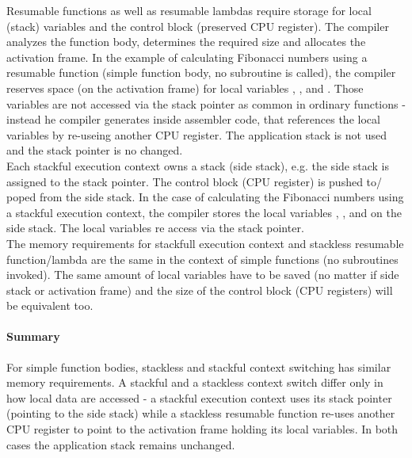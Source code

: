 Resumable functions as well as resumable lambdas require storage for local
(stack) variables and the control block (preserved CPU register). The compiler
analyzes the function body, determines the required size and allocates the
activation frame.
In the example of calculating Fibonacci numbers using a resumable function
(simple function body, no subroutine is called), the compiler reserves space
(on the activation frame) for local variables , ,  and
. Those variables are not accessed via the stack pointer as common in
ordinary functions - instead he compiler generates inside  assembler
code, that references the local variables by re-useing another CPU register. The
application stack is not used and the stack pointer is no changed.\\
\newline
Each stackful execution context owns a stack (side stack), e.g. the side stack
is assigned to the stack pointer. The control block (CPU register) is pushed to/
poped from the side stack.
In the case of calculating the Fibonacci numbers using a stackful execution
context, the compiler stores the local variables , ,  and
 on the side stack. The local variables re access via the stack
pointer.\\
The memory requirements for stackfull execution context and stackless resumable
function/lambda are the same in the context of simple functions (no subroutines
invoked). The same amount of local variables have to be saved (no matter if side
stack or activation frame) and the size of the control block (CPU registers)
will be equivalent too.\\
\newline
\paragraph*{Summary}
For simple function bodies, stackless and stackful context switching has similar
memory requirements. A stackful and a stackless context switch differ only in
how local data are accessed - a stackful execution context uses its stack
pointer (pointing to the side stack) while a stackless resumable function
re-uses another CPU register to point to the activation frame holding its local
variables. In both cases the application stack remains unchanged.

